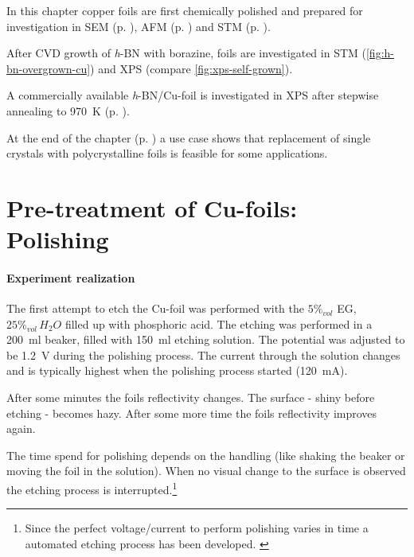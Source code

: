 In this chapter copper foils are first chemically polished and prepared for investigation in SEM (p. \pageref{fig:SEM-gb}), AFM (p. \pageref{fig:foil-afm-as-bought}) and STM (p. \pageref{fig:cu-foil-clean-stm}). 

After CVD growth of \textit{h}-BN with borazine, foils are investigated in STM (\autoref{fig:h-bn-overgrown-cu}) and XPS (compare \autoref{fig:xps-self-grown}). 

A commercially available \textit{h}-BN/Cu-foil is investigated in XPS after stepwise annealing to \SI{970}{\kelvin} (p. \pageref{sec:commercial-hBN-XPS}). 

At the end of the chapter (p. \pageref{sec:foil-use-case}) a use case shows that replacement of single crystals with polycrystalline foils is feasible for some applications.


	\section{Pre-treatment of Cu-foils: Polishing}
	
	\paragraph{Experiment realization}The first attempt to etch the Cu-foil was performed with the $5\%_{vol}$ EG, $25\%_{vol}\,H_2O$ filled up with phosphoric acid. The etching was performed in a \SI{200}{\ml} beaker, filled with \SI{150}{\ml} etching solution. The potential was adjusted to be \SI{1.2}{\V} during the polishing process. The current through the solution changes and is typically highest when the polishing process started (\SI{120}{\milli \ampere}). 
	
After some minutes the foils reflectivity changes. The surface - shiny before etching - becomes hazy. After some more time the foils reflectivity improves again. 
	
	The time spend for polishing depends on the handling (like shaking the beaker or moving the foil in the solution). When no visual change to the surface is observed the etching process is interrupted.\footnote{Since the perfect voltage/current to perform polishing varies in time a automated etching process has been developed. \cite{palmieri_besides_2001}}
	
